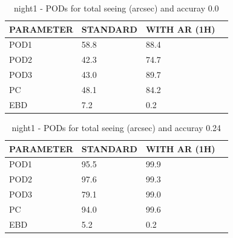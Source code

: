 \begin{table}[p!]
\begin{center}
\begin{tabular}{|l|l|l|l|}
\hline
\multicolumn{1}{|c|}{\cellcolor[HTML]{C0C0C0}\textbf{PARAMETER}} & \multicolumn{1}{c|}{\cellcolor[HTML]{C0C0C0}\textbf{STANDARD}} & \multicolumn{1}{c|}{\cellcolor[HTML]{C0C0C0}\textbf{WITH AR (1H)}} \\
\hline
\cellcolor[HTML]{C0C0C0}POD1  & 58.8                                & 88.4         \\
\cellcolor[HTML]{C0C0C0}POD2  & 42.3                                & 74.7         \\
\cellcolor[HTML]{C0C0C0}POD3  & 43.0                                & 89.7         \\
\cellcolor[HTML]{C0C0C0}PC    & 48.1                                  & 84.2           \\
\cellcolor[HTML]{C0C0C0}EBD   & 7.2                                 & 0.2          \\
\hline
\end{tabular}
\caption{night1 - PODs for total seeing (arcsec) and accuray 0.0}
\label{tab:podsee0.0:night1}
\end{center}
\end{table}
\begin{table}[p!]
\begin{center}
\begin{tabular}{|l|l|l|l|}
\hline
\multicolumn{1}{|c|}{\cellcolor[HTML]{C0C0C0}\textbf{PARAMETER}} & \multicolumn{1}{c|}{\cellcolor[HTML]{C0C0C0}\textbf{STANDARD}} & \multicolumn{1}{c|}{\cellcolor[HTML]{C0C0C0}\textbf{WITH AR (1H)}} \\
\hline
\cellcolor[HTML]{C0C0C0}POD1  & 95.5                                & 99.9         \\
\cellcolor[HTML]{C0C0C0}POD2  & 97.6                                & 99.3         \\
\cellcolor[HTML]{C0C0C0}POD3  & 79.1                                & 99.0         \\
\cellcolor[HTML]{C0C0C0}PC    & 94.0                                  & 99.6           \\
\cellcolor[HTML]{C0C0C0}EBD   & 5.2                                 & 0.2          \\
\hline
\end{tabular}
\caption{night1 - PODs for total seeing (arcsec) and accuray 0.24}
\label{tab:podsee0.24:night1}
\end{center}
\end{table}
